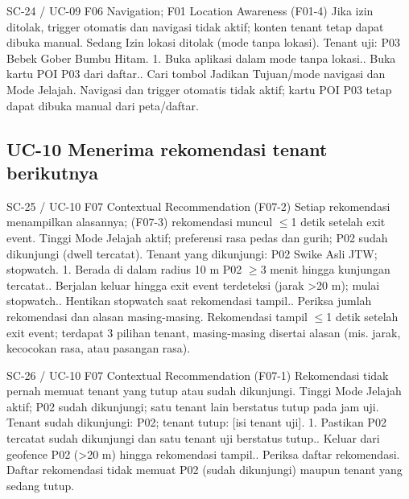 \renewcommand{\tcactual}{Sesuai ekspektasi pada perangkat Android. Navigasi dan trigger otomatis tidak aktif; kartu POI P03 tetap dapat dibuka manual dari peta/daftar.}
{SC-24 / UC-09}
{F06 Navigation; F01 Location Awareness}
{(F01-4) Jika izin ditolak, trigger otomatis dan navigasi tidak aktif; konten tenant tetap dapat dibuka manual.}
{Sedang}
{Izin lokasi ditolak (mode tanpa lokasi).}
{Tenant uji: P03 Bebek Gober Bumbu Hitam.}
{1. Buka aplikasi dalam mode tanpa lokasi.. Buka kartu POI P03 dari daftar.. Cari tombol Jadikan Tujuan/mode navigasi dan Mode Jelajah.}
{Navigasi dan trigger otomatis tidak aktif; kartu POI P03 tetap dapat dibuka manual dari peta/daftar.}

\subsection*{UC-10 Menerima rekomendasi tenant berikutnya}

\renewcommand{\tcactual}{Sesuai ekspektasi pada perangkat Android (Lolos via \texttt{05-recommendation} (10/10) \& \texttt{exit.test}). Rekomendasi tampil \(\le\)1 detik setelah exit event; terdapat 3 pilihan tenant, masing-masing disertai alasan (mis. jarak, kecocokan rasa, atau pasangan rasa).}
{SC-25 / UC-10}
{F07 Contextual Recommendation}
{(F07-2) Setiap rekomendasi menampilkan alasannya; (F07-3) rekomendasi muncul \(\le\)1 detik setelah exit event.}
{Tinggi}
{Mode Jelajah aktif; preferensi rasa pedas dan gurih; P02 sudah dikunjungi (dwell tercatat).}
{Tenant yang dikunjungi: P02 Swike Asli JTW; stopwatch.}
{1. Berada di dalam radius 10 m P02 \(\ge\)3 menit hingga kunjungan tercatat.. Berjalan keluar hingga exit event terdeteksi (jarak >20 m); mulai stopwatch.. Hentikan stopwatch saat rekomendasi tampil.. Periksa jumlah rekomendasi dan alasan masing-masing.}
{Rekomendasi tampil \(\le\)1 detik setelah exit event; terdapat 3 pilihan tenant, masing-masing disertai alasan (mis. jarak, kecocokan rasa, atau pasangan rasa).}

\renewcommand{\tcactual}{Sesuai ekspektasi pada perangkat Android (Lolos via \texttt{05-recommendation} (10/10) \& \texttt{recommendation.test} (10/10)). Daftar rekomendasi tidak memuat P02 (sudah dikunjungi) maupun tenant yang sedang tutup.}
{SC-26 / UC-10}
{F07 Contextual Recommendation}
{(F07-1) Rekomendasi tidak pernah memuat tenant yang tutup atau sudah dikunjungi.}
{Tinggi}
{Mode Jelajah aktif; P02 sudah dikunjungi; satu tenant lain berstatus tutup pada jam uji.}
{Tenant sudah dikunjungi: P02; tenant tutup: [isi tenant uji].}
{1. Pastikan P02 tercatat sudah dikunjungi dan satu tenant uji berstatus tutup.. Keluar dari geofence P02 (>20 m) hingga rekomendasi tampil.. Periksa daftar rekomendasi.}
{Daftar rekomendasi tidak memuat P02 (sudah dikunjungi) maupun tenant yang sedang tutup.}

